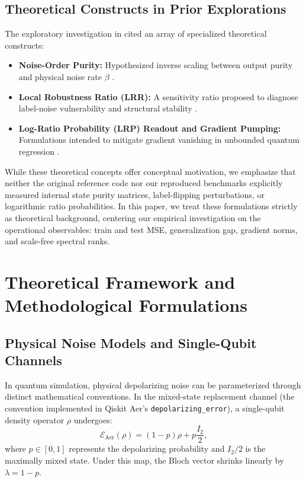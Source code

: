 \documentclass[sn-apacite,Numbered]{sn-jnl}
\begin{document}
\subsection{Theoretical Constructs in Prior Explorations}
The exploratory investigation in \cite{fnqgnnmd_repo} cited an array of specialized theoretical constructs:
\begin{itemize}
    \item \textbf{Noise-Order Purity:} Hypothesized inverse scaling between output purity and physical noise rate $\beta$ \cite{riascosmoreno2025pulse}.
    \item \textbf{Local Robustness Ratio (LRR):} A sensitivity ratio proposed to diagnose label-noise vulnerability and structural stability \cite{catak2025trustworthy}.
    \item \textbf{Log-Ratio Probability (LRP) Readout and Gradient Pumping:} Formulations intended to mitigate gradient vanishing in unbounded quantum regression \cite{seo2026multivariate}.
\end{itemize}
While these theoretical concepts offer conceptual motivation, we emphasize that neither the original reference code nor our reproduced benchmarks explicitly measured internal state purity matrices, label-flipping perturbations, or logarithmic ratio probabilities. In this paper, we treat these formulations strictly as theoretical background, centering our empirical investigation on the operational observables: train and test MSE, generalization gap, gradient norms, and scale-free spectral ranks.

\section{Theoretical Framework and Methodological Formulations}\label{sec:theory}

\subsection{Physical Noise Models and Single-Qubit Channels}
In quantum simulation, physical depolarizing noise can be parameterized through distinct mathematical conventions. In the mixed-state replacement channel (the convention implemented in Qiskit Aer's \texttt{depolarizing\_error}), a single-qubit density operator $\rho$ undergoes:
\begin{equation}
\mathcal{E}_{\text{Aer}}(\rho) = (1 - p)\rho + p \frac{I_2}{2},
\label{eq:aer_noise}
\end{equation}
where $p \in [0, 1]$ represents the depolarizing probability and $I_2/2$ is the maximally mixed state. Under this map, the Bloch vector shrinks linearly by $\lambda = 1 - p$.
\end{document}
